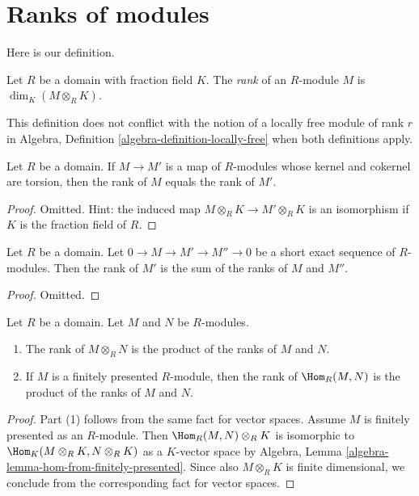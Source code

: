 \section{Ranks of modules}
\label{section-rank}

\noindent
Here is our definition.

\begin{definition}
\label{definition-rank}
Let $R$ be a domain with fraction field $K$.
The {\it rank} of an $R$-module $M$ is $\dim_K(M \otimes_R K)$.
\end{definition}

\noindent
This definition does not conflict with the notion of a locally free module
of rank $r$ in Algebra, Definition \ref{algebra-definition-locally-free}
when both definitions apply.

\begin{lemma}
\label{lemma-torsion-does-not-matter-rank}
Let $R$ be a domain. If $M \to M'$ is a map of $R$-modules
whose kernel and cokernel are torsion, then the rank of $M$
equals the rank of $M'$.
\end{lemma}

\begin{proof}
Omitted. Hint: the induced map $M \otimes_R K \to M' \otimes_R K$
is an isomorphism if $K$ is the fraction field of $R$.
\end{proof}

\begin{lemma}
\label{lemma-rank-additive}
Let $R$ be a domain. Let $0 \to M \to M' \to M'' \to 0$ be a short 
exact sequence of $R$-modules. Then the rank of $M'$ is the
sum of the ranks of $M$ and $M''$.
\end{lemma}

\begin{proof}
Omitted.
\end{proof}

\begin{lemma}
\label{lemma-rank-tensor}
Let $R$ be a domain. Let $M$ and $N$ be $R$-modules.
\begin{enumerate}
\item The rank of $M \otimes_R N$ is the product of the
ranks of $M$ and $N$.
\item If $M$ is a finitely presented $R$-module, then
the rank of $\Hom_R(M, N)$ is the product of the
ranks of $M$ and $N$.
\end{enumerate}
\end{lemma}

\begin{proof}
Part (1) follows from the same fact for vector spaces.
Assume $M$ is finitely presented as an $R$-module.
Then $\Hom_R(M, N) \otimes_R K$ is isomorphic to
$\Hom_K(M \otimes_R K, N \otimes_R K)$ as a $K$-vector space by
Algebra, Lemma \ref{algebra-lemma-hom-from-finitely-presented}.
Since also $M \otimes_R K$ is finite dimensional, we conclude
from the corresponding fact for vector spaces.
\end{proof}

